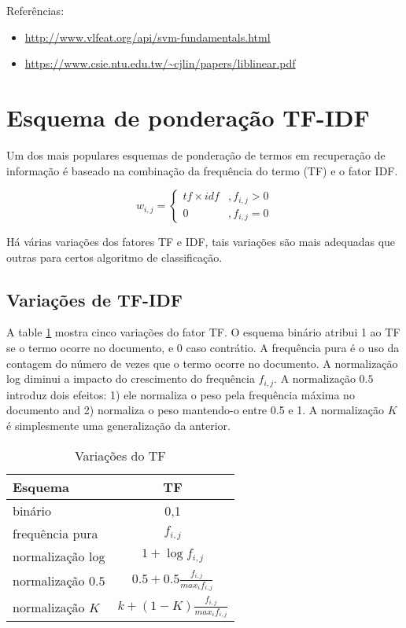 \documentclass[]{book}
\begin{document}
Referências:

\begin{itemize}
\itemsep1pt\parskip0pt
\item
  \url{http://www.vlfeat.org/api/svm-fundamentals.html}
\item
  \url{https://www.csie.ntu.edu.tw/~cjlin/papers/liblinear.pdf}
\end{itemize}

\section{Esquema de ponderação
TF-IDF}\label{esquema-de-ponderacao-tf-idf}

Um dos mais populares esquemas de ponderação de termos em recuperação de
informação é baseado na combinação da frequência do termo (TF) e o fator
IDF.

\begin{equation}
    w_{i,j}=\left\{
                \begin{array}{ll}
                  tf \times idf &, f_{i,j} > 0\\
                  0 &, f_{i,j} = 0
                \end{array}
              \right.
\end{equation}

Há várias variações dos fatores TF e IDF, tais variações são mais
adequadas que outras para certos algoritmo de classificação.

\subsection{Variações de TF-IDF}\label{variacoes-de-tf-idf}

A table \ref{tab:tfs} mostra cinco variações do fator TF. O esquema
binário atribui 1 ao TF se o termo ocorre no documento, e 0 caso
contrátio. A frequência pura é o uso da contagem do número de vezes que
o termo ocorre no documento. A normalização log diminui a impacto do
crescimento do frequência \(f_{i,j}\). A normalização \(0.5\) introduz
dois efeitos: 1) ele normaliza o peso pela frequência máxima no
documento and 2) normaliza o peso mantendo-o entre 0.5 e 1. A
normalização \(K\) é simplesmente uma generalização da anterior.

\begin{table}[ht]
\centering
\begin{tabular}{|lc|}
\hline
  Esquema & TF\\ 
\hline
binário & {0,1}\\
frequência pura & $f_{i,j}$\\
normalização log & $1 + \log f_{i,j}$\\
normalização $0.5$ & $0.5 + 0.5  \frac{f_{i,j}}{max_if_{i,j}}$\\
normalização $K$ & $k + (1-K) \frac{f_{i,j}}{max_if_{i,j}}$\\
\hline
\end{tabular}
\caption{Variações do TF}
\label{tab:tfs}
\end{table}
\end{document}
